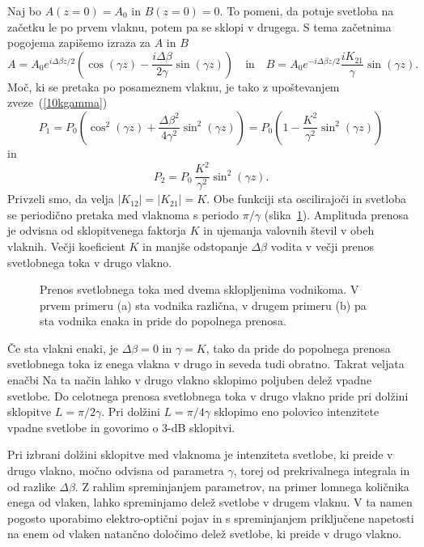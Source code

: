Naj bo $A(z=0) = A_0$ in $B(z=0)=0$. To pomeni, da potuje svetloba na začetku
le po prvem vlaknu, potem pa se sklopi v drugega. S tema začetnima pogojema zapišemo izraza 
za $A$ in $B$
\begin{equation}
 A = A_0 e^{i \Delta \beta z/2} \left( \cos(\gamma z) - 
\frac{i \Delta \beta}{2 \gamma}\sin(\gamma z) \right)
\quad \mathrm{in} \quad 
B =  A_0 e^{-i \Delta \beta z/2} \frac{i K_{21}}{\gamma}\sin(\gamma z).
\end{equation}
Moč, ki se pretaka po posameznem vlaknu, je tako z upoštevanjem zveze~(\ref{10kgamma})
\begin{equation}
P_1 = P_0 \left( \cos^2(\gamma z) + \frac{\Delta \beta^2}{4 \gamma^2}\sin^2(\gamma z) \right)
= P_0 \left( 1 - \frac{K^2}{\gamma^2}\sin^2(\gamma z) \right)
\end{equation}
in
\begin{equation}
P_2 =  P_0\, \frac{K^2}{\gamma^2}\sin^2(\gamma z).
\end{equation}
Privzeli smo, da velja $|K_{12}|=|K_{21}|= K$. 
Obe funkciji sta oscilirajoči in svetloba se periodično pretaka med vlaknoma
s periodo $\pi/\gamma$ (slika~\ref{fig:foscil}). Amplituda prenosa je 
odvisna od sklopitvenega faktorja $K$ in ujemanja valovnih 
števil v obeh vlaknih. Večji koeficient $K$
in manjše odstopanje $\Delta \beta$ vodita v večji prenos svetlobnega toka v drugo vlakno. 
\begin{figure}[h!]
\centering
\def\svgwidth{140truemm} 
 
\caption{Prenos svetlobnega toka med dvema sklopljenima vodnikoma. V prvem primeru (a) sta
vodnika različna, v drugem primeru (b) pa sta vodnika enaka in pride do popolnega prenosa.}
\label{fig:foscil}
\end{figure}

Če sta vlakni 
enaki, je $\Delta \beta = 0$ in $\gamma = K$, tako da pride do popolnega prenosa
svetlobnega toka iz enega vlakna v drugo in seveda tudi obratno.
Takrat veljata enačbi
Na ta način lahko v drugo vlakno sklopimo poljuben delež vpadne svetlobe. 
Do celotnega prenosa svetlobnega toka v drugo vlakno pride pri dolžini sklopitve $L = \pi/2 \gamma$. 
Pri dolžini $L = \pi/4 \gamma$ sklopimo eno polovico intenzitete vpadne svetlobe in govorimo o 3-dB sklopitvi. 

\begin{remark}
 Pri izbrani dolžini sklopitve med vlaknoma je intenziteta svetlobe, ki preide v drugo vlakno,
 močno odvisna od parametra $\gamma$, torej od prekrivalnega integrala in od razlike $\Delta \beta$. 
 Z rahlim spreminjanjem parametrov, na primer lomnega 
 količnika enega od vlaken, lahko spreminjamo delež svetlobe v drugem vlaknu. V ta 
 namen pogosto uporabimo elektro-optični pojav in s spreminjanjem priključene napetosti na
 enem od vlaken natančno določimo delež svetlobe, ki preide v drugo vlakno.  
\end{remark}

